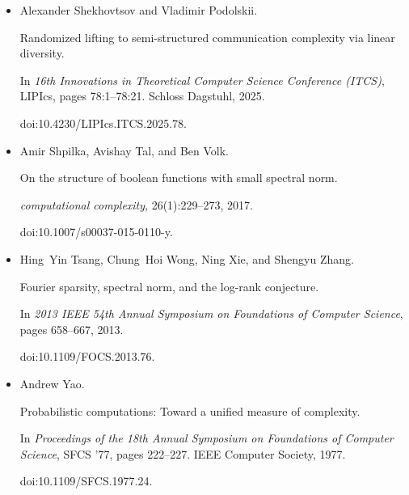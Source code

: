 \begin{itemize}
Towards proving strong direct product theorems.


\emph{computational complexity}, 12(1):1–22, 2003.


doi:10.1007/s00037-003-0175-x.





\item[] 
[52]

Alexander Shekhovtsov and Vladimir Podolskii.


Randomized lifting to semi-structured communication complexity via
linear diversity.


In \emph{16th Innovations in Theoretical Computer Science Conference
(ITCS)}, LIPIcs, pages 78:1–78:21. Schloss Dagstuhl, 2025.


doi:10.4230/LIPIcs.ITCS.2025.78.





\item[] 
[53]

Amir Shpilka, Avishay Tal, and Ben Volk.


On the structure of boolean functions with small spectral norm.


\emph{computational complexity}, 26(1):229–273, 2017.


doi:10.1007/s00037-015-0110-y.





\item[] 
[54]

Hing Yin Tsang, Chung Hoi Wong, Ning Xie, and Shengyu Zhang.


Fourier sparsity, spectral norm, and the log-rank conjecture.


In \emph{2013 IEEE 54th Annual Symposium on Foundations of Computer
Science}, pages 658–667, 2013.


doi:10.1109/FOCS.2013.76.





\item[] 
[55]

Andrew Yao.


Probabilistic computations: Toward a unified measure of complexity.


In \emph{Proceedings of the 18th Annual Symposium on Foundations of
Computer Science}, SFCS ’77, pages 222–227. IEEE Computer Society, 1977.


doi:10.1109/SFCS.1977.24.






\end{itemize}
